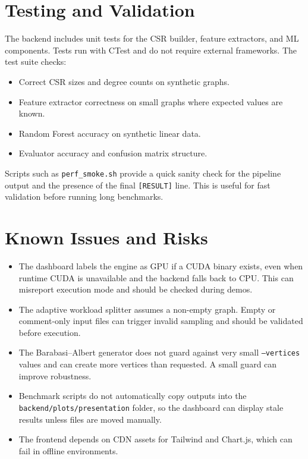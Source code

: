 \documentclass[11pt]{article}
\let\oldsection\section
\renewcommand{\section}{\clearpage\oldsection}
\begin{document}
\section{Testing and Validation}
The backend includes unit tests for the CSR builder, feature extractors, and ML components. Tests run with CTest and do not require external frameworks. The test suite checks:
\begin{itemize}
  \item Correct CSR sizes and degree counts on synthetic graphs.
  \item Feature extractor correctness on small graphs where expected values are known.
  \item Random Forest accuracy on synthetic linear data.
  \item Evaluator accuracy and confusion matrix structure.
\end{itemize}

Scripts such as \texttt{perf\_smoke.sh} provide a quick sanity check for the pipeline output and the presence of the final \texttt{[RESULT]} line. This is useful for fast validation before running long benchmarks.

\section{Known Issues and Risks}
\begin{itemize}
  \item The dashboard labels the engine as GPU if a CUDA binary exists, even when runtime CUDA is unavailable and the backend falls back to CPU. This can misreport execution mode and should be checked during demos.
  \item The adaptive workload splitter assumes a non-empty graph. Empty or comment-only input files can trigger invalid sampling and should be validated before execution.
  \item The Barabasi--Albert generator does not guard against very small \texttt{--vertices} values and can create more vertices than requested. A small guard can improve robustness.
  \item Benchmark scripts do not automatically copy outputs into the \texttt{backend/plots/presentation} folder, so the dashboard can display stale results unless files are moved manually.
  \item The frontend depends on CDN assets for Tailwind and Chart.js, which can fail in offline environments.
\end{itemize}
\end{document}
